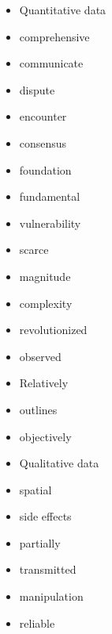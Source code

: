 \documentclass[a4paper,10pt]{article}
\theoremstyle{discussion_style} \newtheorem{discussion}{\color{red}{Discussion point}}
\theoremstyle{theorem_style} \newtheorem{theorem}{Theorem}
\begin{document}
\newpage
\begin{itemize}
\item Quantitative data
\item comprehensive
\item communicate
\item dispute
\item encounter
\item consensus
\item foundation
\item fundamental
\item vulnerability
\item scarce
\item magnitude
\item complexity
\item revolutionized
\item observed
\item Relatively
\item outlines
\item objectively
\item Qualitative data
\item spatial
\item side effects
\item partially
\item transmitted
\item manipulation
\item reliable
\end{itemize}
\end{document}

